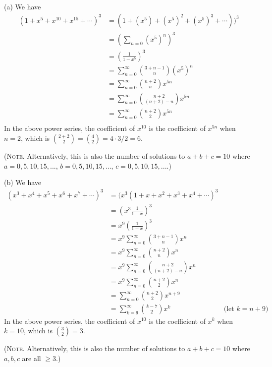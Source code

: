 (a)
We have
\begin{align*}
  (1 + x^5 + x^{10} + x^{15} + \cdots)^3
  &= (1 + (x^5) + (x^5)^2 + (x^5)^{3} + \cdots))^3 \\
  &= \left( \sum_{n = 0} (x^5)^n \right)^3 \\
  &= \left( \frac{1}{1 - x^5} \right)^3 \\
  &= \sum_{n = 0}^\infty \binom{3 + n - 1}{n} (x^5)^n \\
  &= \sum_{n = 0}^\infty \binom{n + 2}{n} x^{5n} \\
  &= \sum_{n = 0}^\infty \binom{n + 2}{(n + 2) - n} x^{5n} \\
  &= \sum_{n = 0}^\infty \binom{n + 2}{2} x^{5n} \\
\end{align*}
In the above power series, the coefficient of $x^{10}$
is the coefficient of $x^{5n}$ when $n = 2$, which is 
$\binom{2 + 2}{2} = \binom{4}{2} = 4 \cdot 3 /2 = 6$.

(\textsc{Note.} Alternatively, this is also the number of solutions to
$a + b + c = 10$ where
$a=0,5,10,15,...$,
$b=0,5,10,15,...$,
$c=0,5,10,15,...$.)

(b)
We have
\begin{align*}
  (x^3 + x^4 + x^5 + x^6 + x^7 + \cdots)^3
  &= (x^3(1 + x + x^2 + x^3 + x^4 + \cdots)^3 \\
  &= \left( x^3 \frac{1}{1 - x} \right)^3 \\
  &= x^9 \left( \frac{1}{1 - x} \right)^3 \\
  &= x^9 \sum_{n=0}^\infty \binom{3 + n - 1}{n} x^n \\
  &= x^9 \sum_{n=0}^\infty \binom{n + 2}{n} x^n \\
  &= x^9 \sum_{n=0}^\infty \binom{n + 2}{(n + 2) - n} x^n \\
  &= x^9 \sum_{n=0}^\infty \binom{n + 2}{2} x^n \\
  &= \sum_{n=0}^\infty \binom{n + 2}{2} x^{n+9} \\
  &= \sum_{k=9}^\infty \binom{k - 7}{2} x^{k} & \text{(let $k = n + 9$)}
\end{align*}
In the above power series, the coefficient of $x^{10}$
is the coefficient of $x^{k}$ when $k = 10$, which is 
$\binom{3}{2} = 3$.


(\textsc{Note.} Alternatively, this is also the number of solutions to
$a + b + c = 10$ where
$a,b,c$ are all $\geq 3$.)

